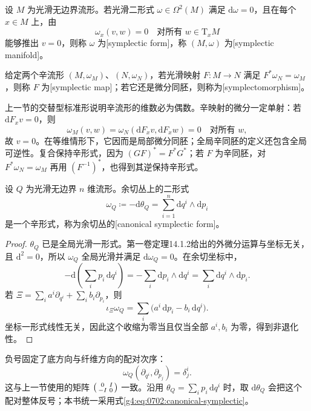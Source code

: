 \begin{definition}
	\label{g4:def:0702:symplectic-manifold}
	设 \(M\) 为光滑无边界流形。若光滑二形式 \(\omega\in\Omega^2(M)\) 满足 \(\mathrm{d}\omega=0\)，且在每个 \(x\in M\) 上，由
	\[
		\omega_x(v,w)=0\quad\text{对所有 }w\in\mathrm{T}_xM
	\]
	能够推出 \(v=0\)，则称 \(\omega\) 为[symplectic form]，称 \((M,\omega)\) 为[symplectic manifold]。

	给定两个辛流形 \((M,\omega_M)\)、\((N,\omega_N)\)，若光滑映射 \(F:M\to N\) 满足 \(F^*\omega_N=\omega_M\)，则称 \(F\) 为[symplectic map]；若它还是微分同胚，则称为[symplectomorphism]。
\end{definition}

上一节的交替型标准形说明辛流形的维数必为偶数。辛映射的微分一定单射：若 \(\mathrm{d}F_xv=0\)，则
\[
	\omega_M(v,w)=\omega_N(\mathrm{d}F_xv,\mathrm{d}F_xw)=0
	\quad\text{对所有 }w,
\]
故 \(v=0\)。在等维情形下，它因而是局部微分同胚；全局辛同胚的定义还包含全局可逆性。复合保持辛形式，因为 \((GF)^*=F^*G^*\)；若 \(F\) 为辛同胚，对 \(F^*\omega_N=\omega_M\) 再用 \((F^{-1})^*\)，也得到其逆保持辛形式。

\begin{theorem}
	\label{g4:thm:0702:cotangent-symplectic}
	设 \(Q\) 为光滑无边界 \(n\) 维流形。余切丛上的二形式
	\begin{equation}
		\label{g4:eq:0702:canonical-symplectic}
		\omega_Q\coloneqq-\mathrm{d}\theta_Q
		=\sum_{i=1}^n\mathrm{d}q^i\wedge\mathrm{d}p_i
	\end{equation}
	是一个辛形式，称为余切丛的[canonical symplectic form]。
\end{theorem}
\begin{proof}
	\(\theta_Q\) 已是全局光滑一形式。第一卷定理14.1.2给出的外微分运算与坐标无关，且 \(\mathrm{d}^2=0\)，所以 \(\omega_Q\) 全局光滑并满足 \(\mathrm{d}\omega_Q=0\)。在余切坐标中，
	\[
		-\mathrm{d}\left(\sum_i p_i\,\mathrm{d}q^i\right)
		=-\sum_i\mathrm{d}p_i\wedge\mathrm{d}q^i
		=\sum_i\mathrm{d}q^i\wedge\mathrm{d}p_i.
	\]
	若 \(\Xi=\sum_i a^i\partial_{q^i}+\sum_i b_i\partial_{p_i}\)，则
	\[
		\iota_\Xi\omega_Q=\sum_i\bigl(a^i\,\mathrm{d}p_i-b_i\,\mathrm{d}q^i\bigr).
	\]
	坐标一形式线性无关，因此这个收缩为零当且仅当全部 \(a^i,b_i\) 为零，得到非退化性。
\end{proof}

负号固定了底方向与纤维方向的配对次序：
\[
	\omega_Q(\partial_{q^i},\partial_{p_j})=\delta^i_j.
\]
这与上一节使用的矩阵
\(\begin{psmallmatrix}0&I\\-I&0\end{psmallmatrix}\)
一致。沿用 \(\theta_Q=\sum_i p_i\,\mathrm{d}q^i\) 时，取 \(\mathrm{d}\theta_Q\) 会把这个配对整体反号；本书统一采用式\eqref{g4:eq:0702:canonical-symplectic}。

